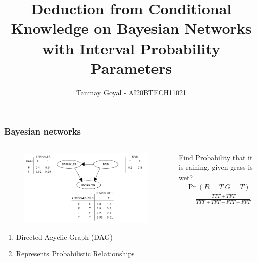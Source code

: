 \documentclass{beamer}
\title{Deduction from Conditional Knowledge on Bayesian Networks with Interval Probability Parameters}
\author{Tanmay Goyal - AI20BTECH11021}
\date{}
\providecommand{\pr}[1]{\ensuremath{\Pr\left(#1\right)}}
\begin{document}
\begin{frame}
\titlepage
\end{frame}
\begin{frame}
\frametitle{Bayesian networks}
\begin{columns}
\begin{column}{0.5\textwidth}
\begin{figure}
\begin{flushleft}
\includegraphics[width=\columnwidth]{Figures/Bayesian Network.png}
\end{flushleft}
\end{figure}
\begin{enumerate}
    \item Directed Acyclic Graph (DAG)\\
    \item Represents Probabilistic Relationships
\end{enumerate}
\end{column}
\begin{column}{0.5\textwidth}
Find Probability that it is raining, given grass is wet?
\begin{align}
    \pr{R = T | G = T}\\
    = \frac{TTT + TFT}{TTT + TFT + FTT + FFT}
\end{align}
\end{column}
\end{columns}

\end{frame}
\end{document}
